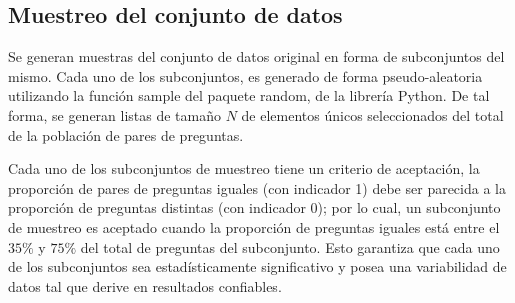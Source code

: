 \subsection{Muestreo del conjunto de datos}

Se generan muestras del conjunto de datos original en forma de subconjuntos del mismo. Cada uno de los subconjuntos, es generado de forma pseudo-aleatoria utilizando la función sample del paquete random, de la librería Python. De tal forma, se generan listas de tamaño \(N\) de elementos únicos seleccionados del total de la población de pares de preguntas.

\bigskip Cada uno de los subconjuntos de muestreo tiene un criterio de aceptación, la proporción de pares de preguntas iguales (con indicador 1) debe ser parecida a la proporción de preguntas distintas (con indicador 0); por lo cual, un subconjunto de muestreo es aceptado cuando la proporción de preguntas iguales está entre el \(35\%\) y \(75\%\) del total de preguntas del subconjunto. Esto garantiza que cada uno de los subconjuntos sea estadísticamente significativo y posea una variabilidad de datos tal que derive en resultados confiables.
